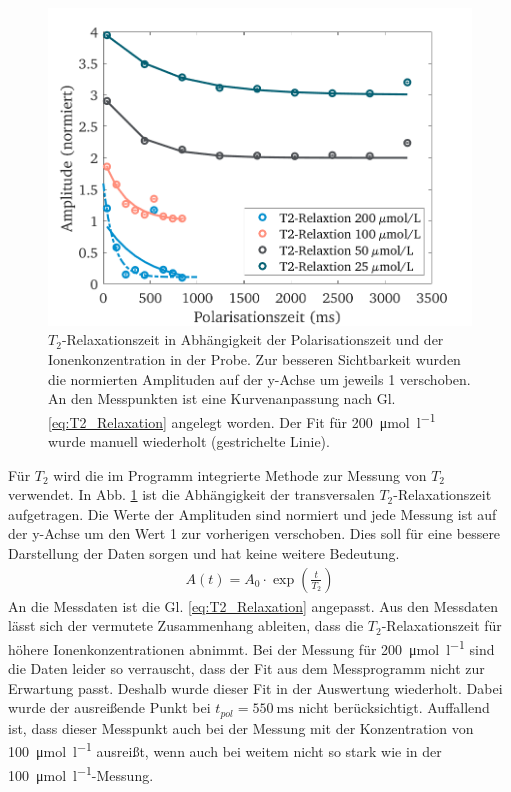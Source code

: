\documentclass[../main.tex]{subfiles}
\begin{document}
    \begin{figure}[h!]
        \centering
        \includegraphics[width=\textwidth]{Bilddateien/11/T2/Part_11_Fig_5}
        \caption{$T_{2}$-Relaxationszeit in Abhängigkeit der Polarisationszeit und der Ionenkonzentration in der Probe. Zur besseren Sichtbarkeit wurden die normierten Amplituden auf der y-Achse um jeweils 1 verschoben. An den Messpunkten ist eine Kurvenanpassung nach Gl. \ref{eq:T2_Relaxation} angelegt worden. Der Fit für \SI{200}{\micro \mol \per \litre} wurde manuell wiederholt (gestrichelte Linie).}
        \label{fig:Relaxation_T2}
    \end{figure}
    Für $T_{2}$ wird die im Programm integrierte Methode zur Messung von $T_{2}$ verwendet. In Abb. \ref{fig:Relaxation_T2} ist die Abhängigkeit der transversalen $T_{2}$-Relaxationszeit aufgetragen. Die Werte der Amplituden sind normiert und jede Messung ist auf der y-Achse um den Wert 1 zur vorherigen verschoben. Dies soll für eine bessere Darstellung der Daten sorgen und hat keine weitere Bedeutung. 
    \begin{align} \label{eq:T2_Relaxation}
        A(t) = A_{0} \cdot \exp\left( \frac{t}{T_{2}}\right)
    \end{align}
    An die Messdaten ist die Gl. \ref{eq:T2_Relaxation} angepasst. Aus den Messdaten lässt sich der vermutete Zusammenhang ableiten, dass die $T_{2}$-Relaxationszeit für höhere Ionenkonzentrationen abnimmt. Bei der Messung für \SI{200}{\micro \mol \per \litre} sind die Daten leider so verrauscht, dass der Fit aus dem Messprogramm nicht zur Erwartung passt. Deshalb wurde dieser Fit in der Auswertung wiederholt. Dabei wurde der ausreißende Punkt bei $t_{pol} = \SI{550}{\milli \second}$ nicht berücksichtigt. Auffallend ist, dass dieser Messpunkt auch bei der Messung mit der Konzentration von \SI{100}{\micro \mol \per \litre} ausreißt, wenn auch bei weitem nicht so stark wie in der \SI{100}{\micro \mol \per \litre}-Messung. 
\end{document}

